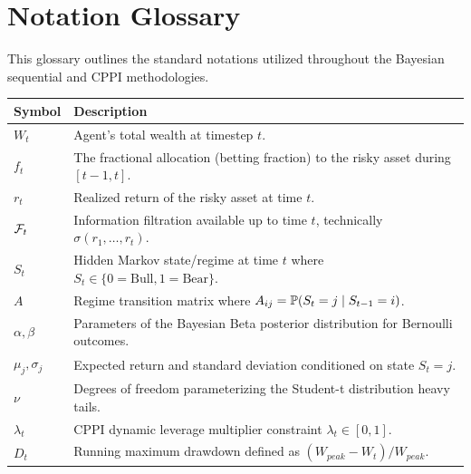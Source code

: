 \chapter*{Notation Glossary}

This glossary outlines the standard notations utilized throughout the Bayesian sequential and CPPI methodologies.

\begin{table}[h]
\centering
\renewcommand{\arraystretch}{1.5}
\begin{tabular}{p{} p{}}
\hline
\textbf{Symbol} & \textbf{Description} \\ \hline
$W_t$ & Agent's total wealth at timestep $t$. \\
$f_t$ & The fractional allocation (betting fraction) to the risky asset during $[t-1, t]$. \\
$r_t$ & Realized return of the risky asset at time $t$. \\
$\mathcal{F}_t$ & Information filtration available up to time $t$, technically $\sigma(r_1, \dots, r_t)$. \\
$S_t$ & Hidden Markov state/regime at time $t$ where $S_t \in \{0=\text{Bull}, 1=\text{Bear}\}$. \\
$A$ & Regime transition matrix where $A_{ij} = \mathbb{P}(S_t = j \mid S_{t-1} = i)$. \\
$\alpha, \beta$ & Parameters of the Bayesian Beta posterior distribution for Bernoulli outcomes. \\
$\mu_j, \sigma_j$ & Expected return and standard deviation conditioned on state $S_t = j$. \\
$\nu$ & Degrees of freedom parameterizing the Student-t distribution heavy tails. \\
$\lambda_t$ & CPPI dynamic leverage multiplier constraint $\lambda_t \in [0, 1]$. \\
$D_t$ & Running maximum drawdown defined as $(W_{peak} - W_t) / W_{peak}$. \\
\hline
\end{tabular}
\end{table}
